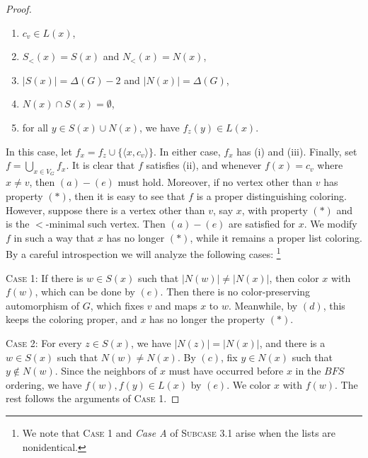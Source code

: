 \documentclass[12pt,reqno,a4paper]{amsart}
\theoremstyle{definition}
\begin{document}
\begin{proof}
\begin{enumerate}
    \item[$(a)$] $c_v\in L(x)$,
    \item[$(b)$] $S_<(x)=S(x)$ and $N_<(x)=N(x)$,
    \item[$(c)$] $|S(x)| = \Delta(G) -2$ and $|N(x)| = \Delta(G)$,
    \item[$(d)$] $N(x) \cap S(x) = \emptyset$,
    \item[$(e)$] for all $y\in S(x) \cup N(x)$, we have $f_z(y)\in L(x)$.
\end{enumerate}
In this case, let $f_x = f_z\cup \{\langle x, c_v \rangle\}$.
In either case, $f_x$ has (i) and (iii). 
Finally, set $f=\bigcup_{x\in V_{G}}f_x$. It is clear that $f$ satisfies (ii), and whenever $f(x)=c_v$ where $x\neq v$, then $(a)-(e)$ must hold. Moreover, if no vertex other than $v$ has property $(\ast)$, then it is easy to see that $f$ is a proper distinguishing coloring. 
However, suppose there is a vertex other than $v$, say $x$, with property $(\ast)$ and is the $<$-minimal such vertex. Then $(a)-(e)$ are satisfied for $x$. We modify $f$ in such a way that $x$ has no longer $(\ast)$, while it remains a proper list coloring.
By a careful introspection we will analyze the following cases: \footnote{We note that \textsc{Case 1} and {\em Case A} of \textsc{Subcase 3.1} arise when the lists are nonidentical.}

\noindent \textsc{Case 1:} If there is $w\in S(x)$ such that $|N(w)| \neq |N(x)|$, then color $x$ with $f(w)$,
which can be done by $(e)$. Then there is no color-preserving automorphism of $G$, which fixes $v$ and maps $x$ to $w$. Meanwhile, by $(d)$, this keeps the coloring proper, and $x$ has no longer the property $(\ast)$.


\noindent \textsc{Case 2:} For every $z\in S(x)$, we have $|N(z)| = |N(x)|$, and there is a $w\in S(x)$ such that $N(w)\neq N(x)$. By $(c)$, fix $y\in N(x)$ such that $y\not\in N(w)$. Since the neighbors of $x$ must have occurred before $x$ in the $BFS$ ordering, we have $f(w), f(y)\in L(x)$ by $(e)$.
We color $x$ with $f(w)$. The rest follows the arguments of \textsc{Case 1}.


\end{proof}
\end{document}
